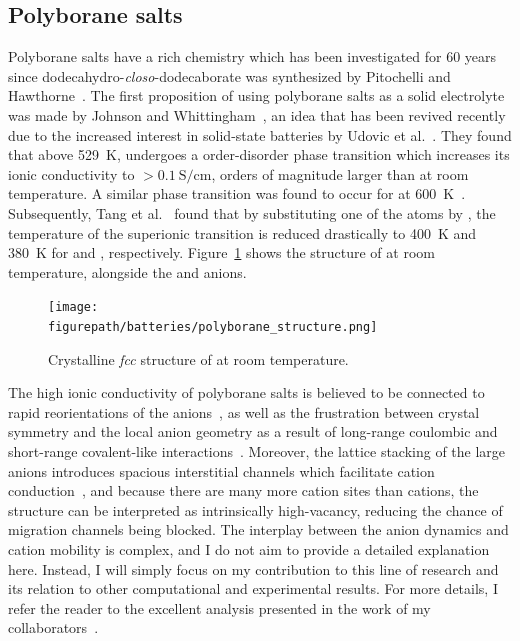 \begin{refsection}
\subsection{Polyborane salts} \label{batteries:sec-polyborane_salts}

Polyborane salts have a rich chemistry which has been investigated for 60 years since dodecahydro\hyp\textit{closo}\hyp dodecaborate  was synthesized by Pitochelli and Hawthorne~\cite{Pitochelli1960}. The first proposition of using polyborane salts as a solid electrolyte was made by Johnson and Whittingham~\cite{Johnson1980}, an idea that has been revived recently due to the increased interest in solid-state batteries by Udovic et al.~\cite{Udovic2014}. They found that above 529~\si{\kelvin},  undergoes a order-disorder phase transition which increases its ionic conductivity to $> 0.1~\si{\siemens\per\centi\meter}$, orders of magnitude larger than at room temperature. A similar phase transition was found to occur for  at 600~\si{\kelvin}~\cite{Verdal2014}. Subsequently, Tang et al.~\cite{Tang2015} found that by substituting one of the  atoms by , the temperature of the superionic transition is reduced drastically to 400~\si{\kelvin} and 380~\si{\kelvin} for  and , respectively. Figure~\ref{batteries:fig-polyborane_structure} shows the structure of  at room temperature, alongside the  and \ce{[CB11H12]^{-}} anions. 

\begin{figure}
\centering
\captionsetup{width=0.9\textwidth}
\texttt{[image: \\figurepath/batteries/polyborane\_structure.png]}
\caption{Crystalline \textit{fcc} structure of  at room temperature.}
\label{batteries:fig-polyborane_structure}
\end{figure}

The high ionic conductivity of polyborane salts is believed to be connected to rapid reorientations of the anions~\cite{Skripov2015, Varley2016}, as well as the frustration between crystal symmetry and the local anion geometry as a result of long-range coulombic and short-range covalent-like interactions~\cite{Kweon2017}. Moreover, the lattice stacking of the large anions introduces spacious interstitial channels which facilitate cation conduction~\cite{Tang2015}, and because there are many more cation sites than cations, the structure can be interpreted as intrinsically high-vacancy, reducing the chance of migration channels being blocked. The interplay between the anion dynamics and cation mobility is complex, and I do not aim to provide a detailed explanation here. Instead, I will simply focus on my contribution to this line of research and its relation to other computational and experimental results. For more details, I refer the reader to the excellent analysis presented in the work of my collaborators~\cite{Varley2016, Kweon2017, Dimitrievska2018}.


\end{refsection}

